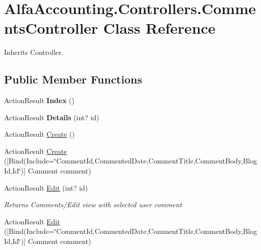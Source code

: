 \hypertarget{class_alfa_accounting_1_1_controllers_1_1_comments_controller}{}\section{Alfa\+Accounting.\+Controllers.\+Comments\+Controller Class Reference}
\label{class_alfa_accounting_1_1_controllers_1_1_comments_controller}


Inherits Controller.

\subsection*{Public Member Functions}
\begin{DoxyCompactItemize}
\item 
\mbox{\label{class_alfa_accounting_1_1_controllers_1_1_comments_controller_a0979158eb6ccd32150adb4ab2dfd76e1}} 
Action\+Result {\bfseries Index} ()
\item 
\mbox{\label{class_alfa_accounting_1_1_controllers_1_1_comments_controller_a6927dd0f57c3e5d5f3f13e1ce9d78b8d}} 
Action\+Result {\bfseries Details} (int? id)
\item 
Action\+Result \hyperlink{class_alfa_accounting_1_1_controllers_1_1_comments_controller_a1f9ba95111373ab74f529d964905b30e}{Create} ()
\item 
Action\+Result \hyperlink{class_alfa_accounting_1_1_controllers_1_1_comments_controller_aef2592b237b0e8b61fe7b489a32c6f41}{Create} (\mbox{[}Bind(Include=\char`\"{}Comment\+Id,Commented\+Date,Comment\+Title,Comment\+Body,Blog\+Id,Id\char`\"{})\mbox{]} Comment comment)
\item 
Action\+Result \hyperlink{class_alfa_accounting_1_1_controllers_1_1_comments_controller_a493788d37b588a20e84e4f5a6f056e4a}{Edit} (int? id)
\begin{DoxyCompactList}\small\item\em Returns Comments/\+Edit view with selected user comment \end{DoxyCompactList}\item 
Action\+Result \hyperlink{class_alfa_accounting_1_1_controllers_1_1_comments_controller_a13d26382297b8f6934fcace5d3393c3d}{Edit} (\mbox{[}Bind(Include=\char`\"{}Comment\+Id,Commented\+Date,Comment\+Title,Comment\+Body,Blog\+Id,Id\char`\"{})\mbox{]} Comment comment)

\end{DoxyCompactItemize}
